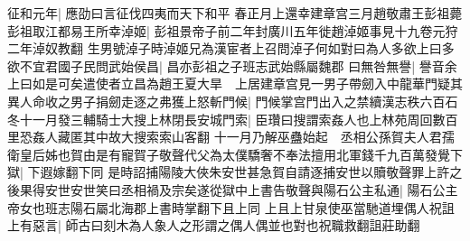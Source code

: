 征和元年|{
	應劭曰言征伐四夷而天下和平}
春正月上還幸建章宫三月趙敬肅王彭祖薨彭祖取江都易王所幸淖姬|{
	彭祖景帝子前二年封廣川五年徙趙淖姬事見十九卷元狩二年淖奴教翻}
生男號淖子時淖姬兄為漢宦者上召問淖子何如對曰為人多欲上曰多欲不宜君國子民問武始侯昌|{
	昌亦彭祖之子班志武始縣屬魏郡}
曰無咎無譽|{
	譽音余}
上曰如是可矣遣使者立昌為趙王夏大旱　上居建章宫見一男子帶劒入中龍華門疑其異人命收之男子捐劒走逐之弗獲上怒斬門候|{
	門候掌宫門出入之禁續漢志秩六百石}
冬十一月發三輔騎士大搜上林閉長安城門索|{
	臣瓚曰搜謂索姦人也上林苑周回數百里恐姦人藏匿其中故大搜索索山客翻}
十一月乃解巫蠱始起　丞相公孫賀夫人君孺衛皇后姊也賀由是有寵賀子敬聲代父為太僕驕奢不奉法擅用北軍錢千九百萬發覺下獄|{
	下遐嫁翻下同}
是時詔捕陽陵大俠朱安世甚急賀自請逐捕安世以贖敬聲罪上許之後果得安世安世笑曰丞相禍及宗矣遂從獄中上書告敬聲與陽石公主私通|{
	陽石公主帝女也班志陽石屬北海郡上書時掌翻下且上同}
上且上甘泉使巫當馳道埋偶人祝詛上有惡言|{
	師古曰刻木為人象人之形謂之偶人偶並也對也祝職救翻詛莊助翻}


